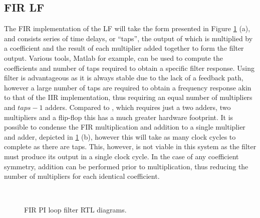 \subsection{\acs{FIR} \acl{LF}}
The \acl{FIR} implementation of the \acl{LF} will take the form presented in Figure \ref{fig:fir_pi} (a), and consists series of time delays, or ``taps'', the output of which is multiplied by a coefficient and the result of each multiplier added together to form the filter output. Various tools, Matlab for example, can be used to compute the coefficients and number of taps required to obtain a specific filter response. Using  filter is advantageous as it is always stable due to the lack of a feedback path, however a large number of taps are required to obtain a frequency response akin to that of the \ac{IIR} implementation, thus requiring an equal number of multipliers and $taps-1$ adders. Compared to , which requires just a two adders, two multipliers and a flip-flop this has a much greater hardware footprint. It is possible to condense the \ac{FIR} multiplication and addition to a single multiplier and adder, depicted in \ref{fig:fir_pi} (b), however this will take as many clock cycles to complete as there are taps. This, however, is not viable in this system as the filter must produce its output in a single clock cycle. In the case of any coefficient symmetry, addition can be performed prior to multiplication, thus reducing the number of multipliers for each identical coefficient.
\begin{figure}[h]
	\centering
	\\
	\caption[\ac{FIR} \ac{PI} loop filter RTL diagrams]{\ac{FIR} \ac{PI} loop filter RTL diagrams.}
	\label{fig:fir_pi}
\end{figure}

